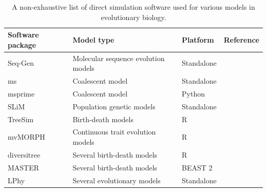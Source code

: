 \documentclass[oneside]{article}
\begin{document}
\begin{center}
  \begin{table}[h]
  \caption{A non-exhaustive list of direct simulation software used for various models in evolutionary biology.}
  \label{tab:sim}
  \centering
  \begin{tabular}{ p{0.7in} p{1.5in} p{1in} p{1.3in} }
    \hline
    Software package & Model type & Platform & Reference \\
    \hline  
    \rowcolor{gray!10}Seq-Gen & Molecular sequence evolution models & Standalone & \citealp{rambaut97} \\
    ms & Coalescent model & Standalone & \citealp{hudson02}\\
    \rowcolor{gray!10}msprime & Coalescent model & Python & \citealp{kelleher16}\\
    SLiM & Population genetic models & Standalone & \citealp{haller19}\\    
    \rowcolor{gray!10}TreeSim & Birth-death models & R & \citealp{stadler11}\\
    mvMORPH & Continuous trait evolution models & R & \citealp{clavel15}\\
    \rowcolor{gray!10}diversitree & Several birth-death models & R & \citealp{fitzjohn12}\\
    MASTER & Several birth-death models & BEAST 2 & \citealp{vaughan13}\\
    \rowcolor{gray!10}LPhy & Several evolutionary models & Standalone & \citealp{drummond22}\\ 
    \hline
  \end{tabular}
  \end{table}
\end{center}



\end{document}
